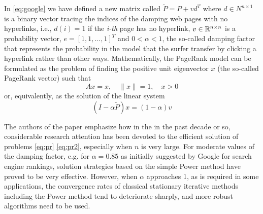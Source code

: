 \noindent In \ref{eq:google} we have defined a new matrix called $\tilde P = P + vd^T$ where $d \in N^{n \times 1}$ is a binary vector tracing the indices of the damping web pages with no hyperlinks, i.e., $d(i) = 1$ if the \emph{i-th} page has no hyperlink, $v \in \mathbb{R}^{n \times n}$ is a probability vector, $e = [1, 1, ... ,1]^T$ and $0<\alpha<1$, the so-called damping factor that represents the probability in the model that the surfer transfer by clicking a hyperlink rather than other ways. Mathematically, the PageRank model can be formulated as the problem of finding the positive unit eigenvector $x$ (the so-called PageRank vector) such that
\begin{equation}\label{eq:pr}
    Ax = x, \quad \lVert x \rVert = 1, \quad x > 0
\end{equation}
or, equivalently, as the solution of the linear system
\begin{equation}\label{eq:pr2}
    (I - \alpha \tilde P)x = (1 - \alpha)v
\end{equation}

\noindent The authors of the paper \cite{SHEN2022126799} emphasize how in the in the past decade or so, considerable research attention has been devoted to the efficient solution of problems \ref{eq:pr} \ref{eq:pr2}, especially when $n$ is very large. For moderate values of the damping factor, e.g. for $\alpha = 0.85$ as initially suggested by Google for search engine rankings, solution strategies based on the simple Power method have proved to be very effective. However, when $\alpha$ approaches 1, as is required in some applications, the convergence rates of classical stationary iterative methods including the Power method tend to deteriorate sharply, and more robust algorithms need to be used. \vspace*{0.4cm}

